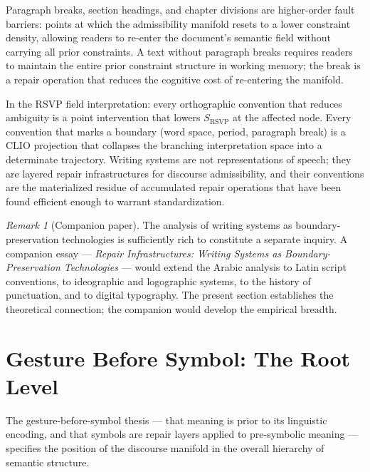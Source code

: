 \documentclass[11pt, a4paper]{article}
\theoremstyle{definition}
\theoremstyle{remark}
\newtheorem{remark}{Remark}
\begin{document}
Paragraph breaks, section headings, and chapter divisions are higher-order
fault barriers: points at which the admissibility manifold resets to a lower
constraint density, allowing readers to re-enter the document's semantic
field without carrying all prior constraints. A text without paragraph
breaks requires readers to maintain the entire prior constraint structure
in working memory; the break is a repair operation that reduces the cognitive
cost of re-entering the manifold.

In the RSVP field interpretation: every orthographic convention that reduces
ambiguity is a point intervention that lowers $S_{\mathrm{RSVP}}$ at the
affected node. Every convention that marks a boundary (word space, period,
paragraph break) is a CLIO projection that collapses the branching
interpretation space into a determinate trajectory. Writing systems are not
representations of speech; they are layered repair infrastructures for
discourse admissibility, and their conventions are the materialized residue
of accumulated repair operations that have been found efficient enough to
warrant standardization.

\begin{remark}[Companion paper]
The analysis of writing systems as boundary-preservation technologies is
sufficiently rich to constitute a separate inquiry. A companion essay ---
\textit{Repair Infrastructures: Writing Systems as Boundary-Preservation
Technologies} --- would extend the Arabic analysis to Latin script conventions,
to ideographic and logographic systems, to the history of punctuation, and
to digital typography. The present section establishes the theoretical
connection; the companion would develop the empirical breadth.
\end{remark}

\section{Gesture Before Symbol: The Root Level}

The gesture-before-symbol thesis --- that meaning is prior to its linguistic
encoding, and that symbols are repair layers applied to pre-symbolic meaning
--- specifies the position of the discourse manifold in the overall hierarchy
of semantic structure.
\end{document}
